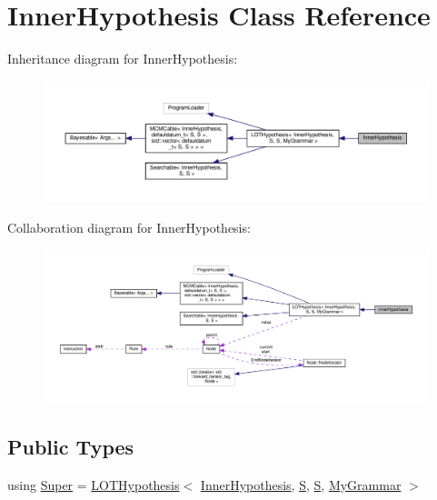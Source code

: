 \hypertarget{class_inner_hypothesis}{}\section{Inner\+Hypothesis Class Reference}
\label{class_inner_hypothesis}


Inheritance diagram for Inner\+Hypothesis\+:
\nopagebreak
\begin{figure}[H]
\begin{center}
\leavevmode
\includegraphics[width=350pt]{class_inner_hypothesis__inherit__graph}
\end{center}
\end{figure}


Collaboration diagram for Inner\+Hypothesis\+:
\nopagebreak
\begin{figure}[H]
\begin{center}
\leavevmode
\includegraphics[width=350pt]{class_inner_hypothesis__coll__graph}
\end{center}
\end{figure}
\subsection*{Public Types}
\begin{DoxyCompactItemize}
\item 
using \hyperlink{class_inner_hypothesis_a1a69a8dd433b64b725be0b2436d6df0c}{Super} = \hyperlink{class_l_o_t_hypothesis}{L\+O\+T\+Hypothesis}$<$ \hyperlink{class_inner_hypothesis}{Inner\+Hypothesis}, \hyperlink{_models_2_formal_language_theory-_complex_2main_8cpp_a51c40915539205f0b5add30b0d68a4cb}{S}, \hyperlink{_models_2_formal_language_theory-_complex_2main_8cpp_a51c40915539205f0b5add30b0d68a4cb}{S}, \hyperlink{class_my_grammar}{My\+Grammar} $>$
\end{DoxyCompactItemize}
